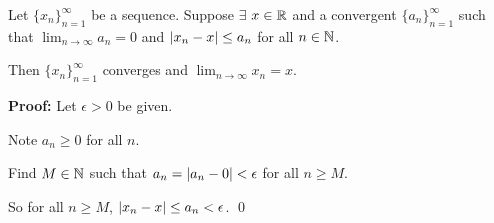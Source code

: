 \documentclass[10pt,aspectratio=169]{beamer}
\begin{document}
\begin{frame}

\begin{proposition}
Let $\{ x_n \}_{n=1}^\infty$ be a sequence. 
Suppose $\exists$ $x \in {\mathbb{R}}$
and a convergent $\{ a_n \}_{n=1}^\infty$
such that
\quad
$\displaystyle \lim_{n\to\infty} a_n = 0$
\quad
and 
\quad
$\displaystyle
\left\lvert {x_n - x} \right\rvert \leq a_n$
for all $n \in {\mathbb{N}}$.

\pause
Then $\{ x_n \}_{n=1}^\infty$ converges and $\displaystyle \lim_{n\to\infty} x_n = x$.
\end{proposition}

\pause
\textbf{Proof:}
Let $\epsilon > 0$ be given.

\pause
\medskip

Note $a_n \geq 0$ for all $n$.

\pause
\medskip

Find $M \in {\mathbb{N}}$ such that $a_n = \left\lvert {a_n - 0} \right\rvert < \epsilon$ for all $n \geq M$.

\pause
\medskip

So for all
$n \geq M$, \quad
$\left\lvert {x_n - x} \right\rvert \leq a_n < \epsilon$.
\qed

\end{frame}
\end{document}
